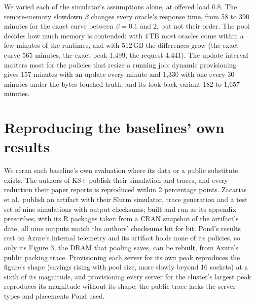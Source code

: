 \documentclass[11pt]{article}
\begin{document}
We varied each of the simulator's assumptions alone, at offered load 0.8. The remote-memory slowdown $\beta$ changes every
oracle's response time, from 58 to 390 minutes for the exact curve between $\beta = 0.1$ and 2, but not their order. The pool
decides how much memory is contended: with 4\,TB most oracles come within a few minutes of the runtimes, and with 512\,GB the
differences grow (the exact curve 565 minutes, the exact peak 1{,}499, the request 4{,}441). The update interval matters most
for the policies that resize a running job: dynamic provisioning gives 157 minutes with an update every minute and 1{,}330
with one every 30 minutes under the bytes-touched truth, and its look-back variant 182 to 1{,}657 minutes.

\section{Reproducing the baselines' own results}
\label{sec:repro}

\begin{table}[h]
\centering
\caption{KS+'s memory wastage reduction against its baselines, as the KS+ paper reports it and as the authors' code gives it
on their traces, for 25, 50 and 75\% training data.}

\end{table}

\begin{table}[h]
\centering
\caption{DRAM saved by pooling a fixed share of every virtual machine's memory, in percent, against the pool size in CPU
sockets, from the public Azure packing trace, with each server provisioned for its own peak or every server for the
cluster's largest peak; and Pond's Figure 3 at a 50\% share.}

\end{table}

We reran each baseline's own evaluation where its data or a public substitute exists. The authors of KS+ publish their
simulation and traces, and every reduction their paper reports is reproduced within 2 percentage points. Zacarias et al.\
publish an artifact with their Slurm simulator, trace generation and a test set of nine simulations with output checksums;
built and run as its appendix prescribes, with its R packages taken from a CRAN snapshot of the artifact's date, all nine
outputs match the authors' checksums bit for bit. Pond's results rest on Azure's internal telemetry and its artifact holds
none of its policies, so only its Figure 3, the DRAM that pooling saves, can be rebuilt, from Azure's public packing trace.
Provisioning each server for its own peak reproduces the figure's shape (savings rising with pool size, more slowly beyond
16 sockets) at a sixth of its magnitude, and provisioning every server for the cluster's largest peak reproduces its magnitude
without its shape; the public trace lacks the server types and placements Pond used.



\end{document}
